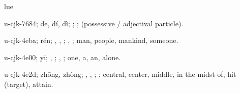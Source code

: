 \begin{multicols}{2}
lue{}\cjkgGlue{}\cjkgGlue{}\cjkgGlue{}\cjkgGlue{}\cjkgGlue{}\cjkgGlue{}\cjkgGlue{}\cjkgGlue{}\cjkgGlue{}\cjkgGlue{}\cjkgGlue{}\cjkgGlue{}\cjkgGlue{}\cjkgGlue{}\cjkgGlue{}\cjkgGlue{}\cjkgGlue{}\cjkgGlue{}\cjkgGlue{}\cjkgGlue{}\cjkgGlue{}\cjkgGlue{}\cjkgGlue{}\cjkgGlue{}\cjkgGlue{}\cjkgGlue{}\cjkgGlue{}\cjkgGlue{}\cjkgGlue{}\cjkgGlue{}\cjkgGlue{}\cjkgGlue{}\cjkgGlue{}

{\RaggedRight{}\cjkgGlue{}u-cjk-7684; de, dí, dì; \cjkgGlue{}; \cjkgGlue{}; (possessive / adjectival particle).

\cjkgGlue{}u-cjk-4eba; rén; \cjkgGlue{}, \cjkgGlue{}, \cjkgGlue{}; \cjkgGlue{}, \cjkgGlue{}; man, people, mankind, someone.

\cjkgGlue{}u-cjk-4e00; yī; \cjkgGlue{}, \cjkgGlue{}\cjkgGlue{}\cjkgGlue{}; \cjkgGlue{}, \cjkgGlue{}; one, a, an, alone.

\cjkgGlue{}u-cjk-4e2d; zhōng, zhòng; \cjkgGlue{}, \cjkgGlue{}, \cjkgGlue{}\cjkgGlue{}\cjkgGlue{}; \cjkgGlue{}; central, center, middle, in the midst of, hit (target), attain.

}
\end{multicols}
